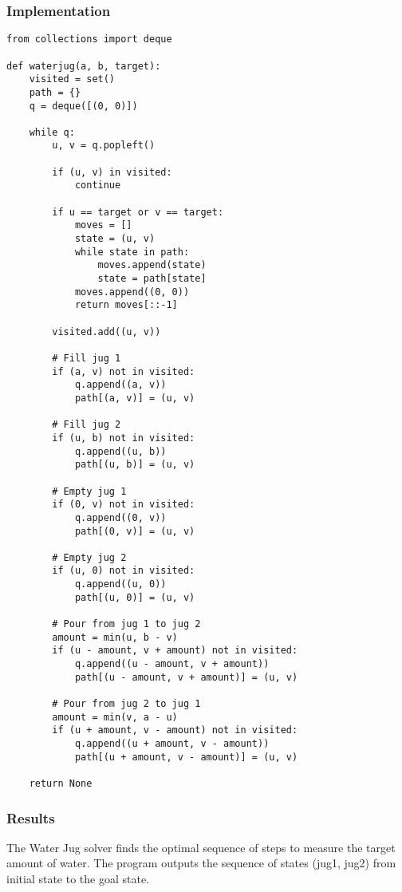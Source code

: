 \documentclass[11pt,a4paper]{article}
\begin{document}
\subsubsection{Implementation}
\begin{lstlisting}[caption=Water Jug Problem Implementation]
from collections import deque

def waterjug(a, b, target):
    visited = set()
    path = {}
    q = deque([(0, 0)])
    
    while q:
        u, v = q.popleft()
        
        if (u, v) in visited:
            continue
            
        if u == target or v == target:
            moves = []
            state = (u, v)
            while state in path:
                moves.append(state)
                state = path[state]
            moves.append((0, 0))
            return moves[::-1]
            
        visited.add((u, v))
        
        # Fill jug 1
        if (a, v) not in visited:
            q.append((a, v))
            path[(a, v)] = (u, v)
        
        # Fill jug 2
        if (u, b) not in visited:
            q.append((u, b))
            path[(u, b)] = (u, v)
        
        # Empty jug 1
        if (0, v) not in visited:
            q.append((0, v))
            path[(0, v)] = (u, v)
        
        # Empty jug 2
        if (u, 0) not in visited:
            q.append((u, 0))
            path[(u, 0)] = (u, v)
        
        # Pour from jug 1 to jug 2
        amount = min(u, b - v)
        if (u - amount, v + amount) not in visited:
            q.append((u - amount, v + amount))
            path[(u - amount, v + amount)] = (u, v)
        
        # Pour from jug 2 to jug 1
        amount = min(v, a - u)
        if (u + amount, v - amount) not in visited:
            q.append((u + amount, v - amount))
            path[(u + amount, v - amount)] = (u, v)
    
    return None
\end{lstlisting}

\subsubsection{Results}
The Water Jug solver finds the optimal sequence of steps to measure the target amount of water. The program outputs the sequence of states (jug1, jug2) from initial state to the goal state.
\end{document}
